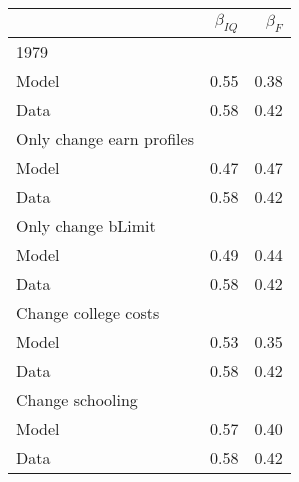 \begin{tabular}{lrr}
\hline
  & $\beta_{IQ}$  & $\beta_{F}$  \\ 
\hline
1979 &   &   \\ 
Model & 0.55  & 0.38  \\ 
Data & 0.58  & 0.42  \\ 
Only change earn profiles &   &   \\ 
Model & 0.47  & 0.47  \\ 
Data & 0.58  & 0.42  \\ 
Only change bLimit &   &   \\ 
Model & 0.49  & 0.44  \\ 
Data & 0.58  & 0.42  \\ 
Change college costs &   &   \\ 
Model & 0.53  & 0.35  \\ 
Data & 0.58  & 0.42  \\ 
Change schooling &   &   \\ 
Model & 0.57  & 0.40  \\ 
Data & 0.58  & 0.42  \\ 
\hline
\end{tabular}%
